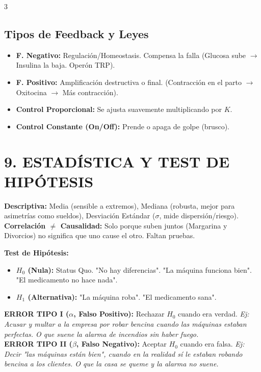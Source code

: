 \documentclass[11pt,landscape,letterpaper]{extarticle}
\begin{document}
\begin{multicols*}{3}
	\subsection{Tipos de Feedback y Leyes}
	\begin{itemize}
		\item \textbf{F. Negativo:} Regulación/Homeostasis. Compensa la falla (Glucosa sube $\rightarrow$ Insulina la baja. Operón TRP).
		\item \textbf{F. Positivo:} Amplificación destructiva o final. (Contracción en el parto $\rightarrow$ Oxitocina $\rightarrow$ Más contracción).
		\item \textbf{Control Proporcional:} Se ajusta suavemente multiplicando por $K$.
		\item \textbf{Control Constante (On/Off):} Prende o apaga de golpe (brusco).
	\end{itemize}

	\section{9. ESTADÍSTICA Y TEST DE HIPÓTESIS}
	\textbf{Descriptiva:} Media (sensible a extremos), Mediana (robusta, mejor para asimetrías como sueldos), Desviación Estándar ($\sigma$, mide dispersión/riesgo).
	\textbf{Correlación $\neq$ Causalidad:} Solo porque suben juntos (Margarina y Divorcios) no significa que uno cause el otro. Faltan pruebas.

	\textbf{Test de Hipótesis:}
	\begin{itemize}
		\item \textbf{$H_0$ (Nula):} Status Quo. "No hay diferencias". "La máquina funciona bien". "El medicamento no hace nada".
		\item \textbf{$H_1$ (Alternativa):} "La máquina roba". "El medicamento sana".
	\end{itemize}
	\begin{tcolorbox}[colback=boxbg,colframe=myblue,boxrule=1pt,left=2pt,right=2pt,top=2pt,bottom=2pt]
		\textbf{ERROR TIPO I ($\alpha$, Falso Positivo):} Rechazar $H_0$ cuando era verdad.
		\textit{Ej: Acusar y multar a la empresa por robar bencina cuando las máquinas estaban perfectas. O que suene la alarma de incendios sin haber fuego.} \\
		\textbf{ERROR TIPO II ($\beta$, Falso Negativo):} Aceptar $H_0$ cuando era falsa.
		\textit{Ej: Decir "las máquinas están bien", cuando en la realidad sí le estaban robando bencina a los clientes. O que la casa se queme y la alarma no suene.}
	\end{tcolorbox}


\end{multicols*}
\end{document}

